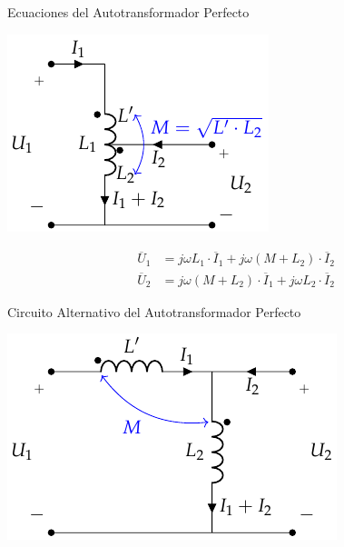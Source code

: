 \documentclass[aspectratio=169, usenames,svgnames,dvipsnames]{beamer}
\begin{document}
\begin{frame}[label={sec:org0942ca7}]{Ecuaciones del Autotransformador Perfecto}
\begin{center}
\includegraphics[height=0.5\textheight]{../figs/AutotrafoPerfecto.pdf}
\end{center}

\begin{align*}
  \overline{U}_1 &= j \omega L_1 \cdot \overline{I}_1 + j \omega (M + L_2) \cdot \overline{I}_2\\
  \overline{U}_2 &= j \omega (M + L_2) \cdot \overline{I}_1 + j \omega L_2 \cdot \overline{I}_2
\end{align*}
\end{frame}
\begin{frame}[label={sec:org7a72da6}]{Circuito Alternativo del Autotransformador Perfecto}
\begin{center}
\includegraphics[height=0.8\textheight]{../figs/AutotrafoPerfecto2.pdf}
\end{center}
\end{frame}
\end{document}
